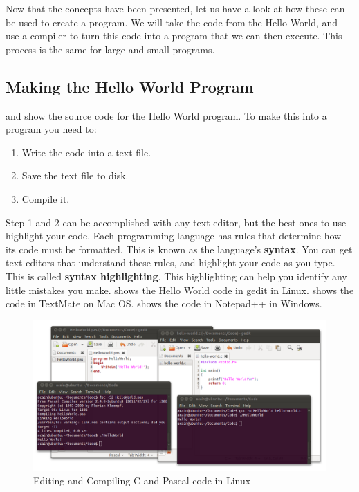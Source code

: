 Now that the concepts have been presented, let us have a look at how these can be used to create a program. We will take the code from the Hello World, and use a compiler to turn this code into a program that we can then execute. This process is the same for large and small programs.

\subsection{Making the Hello World Program} %
\label{sub:compiling_code}

 and  show the source code for the Hello World program. To make this into a program you need to:

\begin{enumerate}
  \item Write the code into a text file.
  \item Save the text file to disk.
  \item Compile it.
\end{enumerate}

Step 1 and 2 can be accomplished with any text editor, but the best ones to use highlight your code. Each programming language has rules that determine how its code must be formatted. This is known as the language's \textbf{syntax}. You can get text editors that understand these rules, and highlight your code as you type. This is called \textbf{syntax highlighting}. This highlighting can help you identify any little mistakes you make.  shows the Hello World code in gedit in Linux.  shows the code in TextMate on Mac OS.  shows the code in Notepad++ in Windows.

\begin{figure}[h]
   \centering
   \includegraphics[width=\textwidth]{./topics/programs-and-compilers/images/LinuxEditors} 
   \caption{Editing and Compiling C and Pascal code in Linux}
   \label{fig:linux-editors}
\end{figure}


